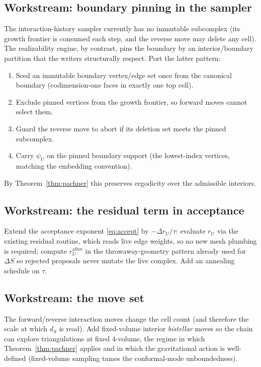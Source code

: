 \documentclass[11pt]{article}
\theoremstyle{definition}
\theoremstyle{plain}
\begin{document}
\subsection{Workstream: boundary pinning in the sampler}

The interaction-history sampler currently has no immutable subcomplex (its growth frontier
is consumed each step, and the reverse move may delete any cell). The realizability engine,
by contrast, pins the boundary by an interior/boundary partition that the writers structurally
respect. Port the latter pattern:
\begin{enumerate}[leftmargin=2.4em]
\item Seed an immutable boundary vertex/edge set once from the canonical boundary
(codimension-one faces in exactly one top cell).
\item Exclude pinned vertices from the growth frontier, so forward moves cannot select them.
\item Guard the reverse move to abort if its deletion set meets the pinned subcomplex.
\item Carry $\psi_U$ on the pinned boundary support (the lowest-index vertices, matching the
embedding convention).
\end{enumerate}
By Theorem~\ref{thm:pachner} this preserves ergodicity over the admissible interiors.

\subsection{Workstream: the residual term in acceptance}

Extend the acceptance exponent \eqref{eq:accept} by $-\Delta r_U/\tau$:
evaluate $r_U$ via the existing residual routine, which reads live edge weights, so no new
mesh plumbing is required; compute $r_U^{\text{after}}$ in the throwaway-geometry pattern
already used for $\Delta S$ so rejected proposals never mutate the live complex. Add an
annealing schedule on $\tau$.

\subsection{Workstream: the move set}

The forward/reverse interaction moves change the cell count (and therefore the scale at
which $d_S$ is read). Add fixed-volume interior \emph{bistellar} moves so the chain can
explore triangulations at fixed $4$-volume, the regime in which Theorem~\ref{thm:pachner}
applies and in which the gravitational action is well-defined (fixed-volume sampling tames
the conformal-mode unboundedness).
\end{document}
